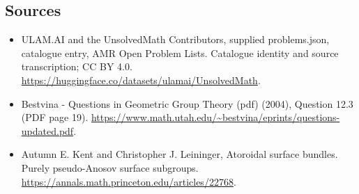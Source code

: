 \documentclass[11pt,a4paper]{article}
\begin{document}
\subsection{Sources}
\begin{itemize}
\item[S1] ULAM.AI and the UnsolvedMath Contributors, supplied problems.json, catalogue entry, AMR Open Problem Lists. Catalogue identity and source transcription; CC BY 4.0.
\url{https://huggingface.co/datasets/ulamai/UnsolvedMath}.
\item[S2] Bestvina - Questions in Geometric Group Theory (pdf) (2004), Question 12.3 (PDF page 19). 
\url{https://www.math.utah.edu/~bestvina/eprints/questions-updated.pdf}.
\item[S3] Autumn E. Kent and Christopher J. Leininger, Atoroidal surface bundles. Purely pseudo-Anosov surface subgroups.
\url{https://annals.math.princeton.edu/articles/22768}.
\end{itemize}
\end{document}
